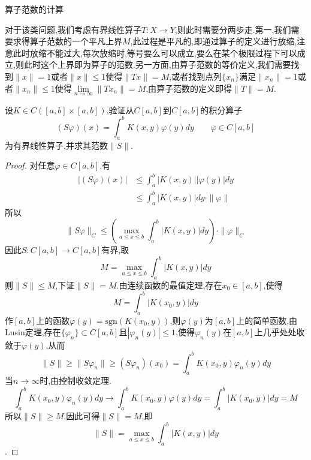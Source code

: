 \documentclass[lang=cn,18pt]{elegantbook}
\begin{document}
\begin{problem}
    算子范数的计算
\end{problem}
\begin{note}
    对于该类问题,我们考虑有界线性算子$T:X\to Y$,则此时需要分两步走.第一,我们需要求得算子范数的一个平凡上界$M$,此过程是平凡的,即通过算子的定义进行放缩,注意此时放缩不能过大,每次放缩时,等号要么可以成立,要么在某个极限过程下可以成立,则此时这个上界即为算子的范数.另一方面,由算子范数的等价定义,我们需要找到$\|x\|=1$或者$\|x\|\leqslant 1$使得$\|Tx\|=M$,或者找到点列$\{x_n\}$满足$\|x_n\|=1$或者$\|x_n\|\leqslant 1$使得$\lim\limits_{n\to \infty}\|Tx_n\|=M$,由算子范数的定义即得$\|T\|=M$.
\end{note}

\begin{example}
    设$K \in C([a,b]\times [a,b])$,验证从$C[a,b]$到$C[a,b]$的积分算子
    $$(S\varphi)(x)=\int_{a}^{b}K(x,y)\varphi(y)dy \quad\quad \varphi \in C[a,b]$$
    为有界线性算子,并求其范数$\|S\|$.
\end{example}
\begin{proof}
    对任意$\varphi \in C[a,b]$,有
    \begin{align*}
        |(S\varphi)(x)| &\leqslant \int_{a}^{b}|K(x,y)||\varphi(y)|dy \\
        & \leqslant \int_{a}^{b}|K(x,y)|dy \cdot \|\varphi\|
    \end{align*}
    所以
    $$\|S\varphi\|_C \leqslant \left(\max\limits_{a\leqslant x \leqslant b}\int_{a}^{b}|K(x,y)|dy \right)\cdot \|\varphi\|_{C}$$
    因此$S:C[a,b] \to C[a,b]$有界,取
    $$M=\max\limits_{a \leqslant x \leqslant b}\int_{a}^{b}|K(x,y)|dy$$
    则$\|S\| \leqslant M$,下证$\|S\|=M$.由连续函数的最值定理,存在$x_0 \in [a,b]$,使得
    $$M=\int_{a}^{b}|K(x_0,y)|dy$$
    作$[a,b]$上的函数$\varphi(y)=\text{sgn}(K(x_0,y))$,则$\varphi(y)$为$[a,b]$上的简单函数,由Lusin定理,存在$\{\varphi_n\} \subset C[a,b]$且$|\varphi_n(y)|\leqslant 1$,使得$\varphi_n(y)$在$[a,b]$上几乎处处收敛于$\varphi(y)$,从而
    $$\|S\| \geqslant \|S \varphi_n\| \geqslant (S\varphi_n)(x_0)=\int_{a}^{b}K(x_0,y)\varphi_n(y)dy$$
    当$n \to \infty$时,由控制收敛定理.
    $$\int_{a}^{b}K(x_0,y)\varphi_n(y)dy\to \int_{a}^{b}K(x_0,y)\varphi(y)dy=\int_{a}^{b}|K(x_0,y)|dy=M$$
    所以$\|S\| \geqslant M$,因此可得$\|S\|=M$,即
    $$\|S\|=\max\limits_{a\leqslant x \leqslant b}\int_{a}^{b}|K(x,y)|dy$$.

    
\end{proof}
\end{document}
